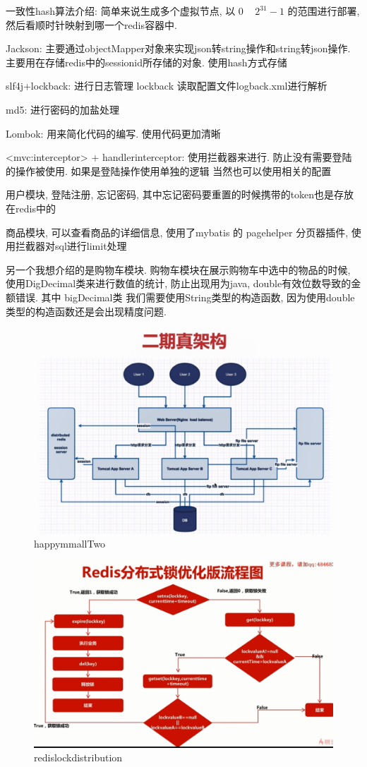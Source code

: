 一致性hash算法介绍:
简单来说生成多个虚拟节点, 以 0 ~ $2^31-1$ 的范围进行部署, 然后看顺时针映射到哪一个redis容器中.


Jackson: 主要通过objectMapper对象来实现json转string操作和string转json操作. 主要用在存储redis中的sessionid所存储的对象. 使用hash方式存储

slf4j+lockback: 进行日志管理 lockback 读取配置文件logback.xml进行解析

md5: 进行密码的加盐处理

Lombok: 用来简化代码的编写. 使用代码更加清晰

<mvc:interceptor> + handlerinterceptor: 使用拦截器来进行. 防止没有需要登陆的操作被使用. 如果是登陆操作使用单独的逻辑 当然也可以使用相关的配置

用户模块, 登陆注册, 忘记密码, 其中忘记密码要重置的时候携带的token也是存放在redis中的

商品模块, 可以查看商品的详细信息, 使用了mybatis 的 pagehelper 分页器插件, 使用拦截器对sql进行limit处理


另一个我想介绍的是购物车模块.
购物车模块在展示购物车中选中的物品的时候, 使用DigDecimal类来进行数值的统计, 防止出现用为java, double有效位数导致的金额错误. 其中 bigDecimal类 我们需要使用String类型的构造函数, 因为使用double类型的构造函数还是会出现精度问题.

\begin{figure}
	\centering
	\includegraphics[width=0.7\linewidth]{figures/happymmallTwo.png}
	\caption{happymmallTwo}
	\label{fig:happymmallTwo}
\end{figure}

\begin{figure}
	\centering
	\includegraphics[width=0.7\linewidth]{figures/redislockdistribution.png}
	\caption{redislockdistribution}
	\label{fig:redislockdistribution}
\end{figure}


